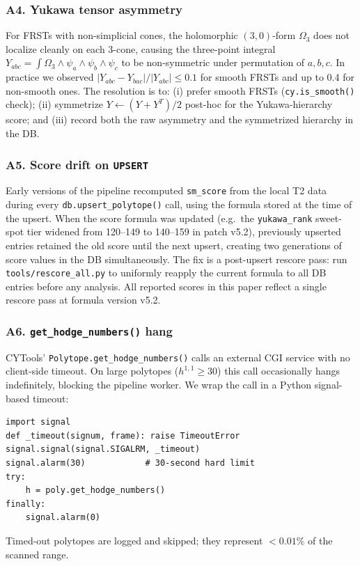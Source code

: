 \documentclass[11pt,a4paper]{article}
\begin{document}
\subsubsection*{A4. Yukawa tensor asymmetry}

For FRSTs with non-simplicial cones, the holomorphic
$(3,0)$-form $\Omega_3$ does not localize cleanly on each
3-cone, causing the three-point integral
$Y_{abc} = \int \Omega_3 \wedge \psi_a \wedge \psi_b \wedge \psi_c$
to be non-symmetric under permutation of $a,b,c$.
In practice we observed $|Y_{abc} - Y_{bac}|/|Y_{abc}| \leq 0.1$
for smooth FRSTs and up to 0.4 for non-smooth ones.
The resolution is to:
(i) prefer smooth FRSTs (\texttt{cy.is\_smooth()} check);
(ii) symmetrize $Y \leftarrow (Y + Y^T)/2$ post-hoc for the
Yukawa-hierarchy score; and
(iii) record both the raw asymmetry and the symmetrized hierarchy
in the DB.

\subsubsection*{A5. Score drift on \texttt{UPSERT}}

Early versions of the pipeline recomputed
\texttt{sm\_score} from the local T2 data during every
\texttt{db.upsert\_polytope()} call, using the formula
stored at the time of the upsert.
When the score formula was updated (e.g.\ the
\texttt{yukawa\_rank} sweet-spot tier widened from 120--149 to
140--159 in patch v5.2), previously upserted entries retained
the old score until the next upsert, creating two generations
of score values in the DB simultaneously.
The fix is a post-upsert rescore pass:
run \texttt{tools/rescore\_all.py} to uniformly reapply the
current formula to all DB entries before any analysis.
All reported scores in this paper reflect a single rescore pass
at formula version v5.2.

\subsubsection*{A6. \texttt{get\_hodge\_numbers()} hang}

CYTools' \texttt{Polytope.get\_hodge\_numbers()} calls an external
CGI service with no client-side timeout.
On large polytopes ($h^{1,1} \geq 30$) this call occasionally
hangs indefinitely, blocking the pipeline worker.
We wrap the call in a Python signal-based timeout:
\begin{verbatim}
import signal
def _timeout(signum, frame): raise TimeoutError
signal.signal(signal.SIGALRM, _timeout)
signal.alarm(30)            # 30-second hard limit
try:
    h = poly.get_hodge_numbers()
finally:
    signal.alarm(0)
\end{verbatim}
Timed-out polytopes are logged and skipped; they represent
$<0.01\%$ of the scanned range.
\end{document}

